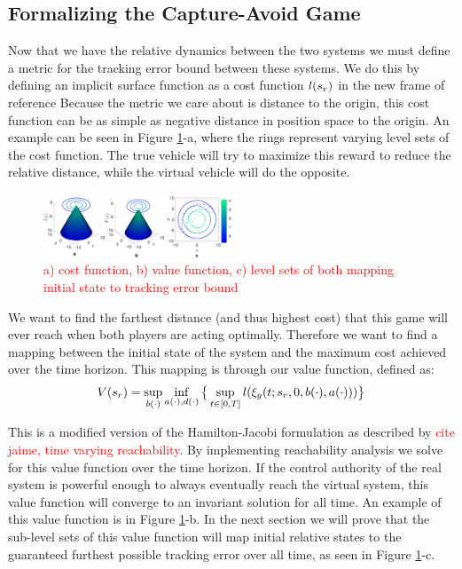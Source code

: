 \subsection{Formalizing the Capture-Avoid Game}
Now that we have the relative dynamics between the two systems we must define a metric for the tracking error bound between these systems. We do this by defining an implicit surface function as a cost function $l(s_r)$ in the new frame of reference  Because the metric we care about is distance to the origin, this cost function can be as simple as negative distance in position space to the origin. An example can be seen in Figure \ref{fig:quad4D_example}-a, where the rings represent varying level sets of the cost function. The true vehicle will try to maximize this reward to reduce the relative distance, while the virtual vehicle will do the opposite.

\begin{figure}
	\centering
	\includegraphics[width=0.5\textwidth]{fig/quad4D_example}
	\caption{\textcolor{red}{a) cost function, b) value function, c) level sets of both mapping initial state to tracking error bound}}
	\label{fig:quad4D_example}
\end{figure} 
 
 We want to find the farthest distance (and thus highest cost) that this game will ever reach when both players are acting optimally. Therefore we want to find a mapping between the initial state of the system and the maximum cost achieved over the time horizon. This mapping is through our value function, defined as: 
 \begin{equation}
 \begin{aligned}
 	V(s_r)= \sup_{b(\cdot)} \inf_{a(\cdot), d(\cdot)} \big\{\sup_{t\in [0, T]} l(\xi_g(t; s_r, 0, b(\cdot), a(\cdot)))\big\}
 	\end{aligned}
 \end{equation} 
 
 This is a modified version of the Hamilton-Jacobi formulation as described by \textcolor{red}{cite jaime, time varying reachability}. By implementing reachability analysis we solve for this value function over the time horizon. If the control authority of the real system is powerful enough to always eventually reach the virtual system, this value function will converge to an invariant solution for all time.  An example of this value function is in Figure \ref{fig:quad4D_example}-b. In the next section we will prove that the sub-level sets of this value function will map initial relative states to the guaranteed furthest possible tracking error over all time, as seen in Figure \ref{fig:quad4D_example}-c.
 

